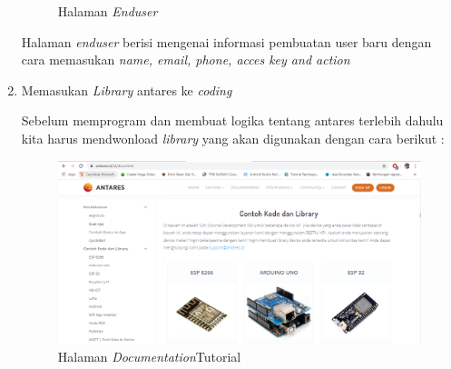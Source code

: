 \begin{enumerate}
\begin{figure}[H]
    \caption{Halaman \textit{Enduser}}
    \label{print}
    \end{figure}
    \par Halaman \textit{enduser} berisi mengenai informasi pembuatan user baru dengan cara memasukan \textit{name, email, phone, acces key and action}
\item Memasukan \textit{ Library} antares ke \textit{coding}
\par Sebelum memprogram dan membuat logika tentang antares terlebih dahulu kita harus mendwonload \textit{library} yang akan digunakan dengan cara berikut :
 \begin{figure}[H]
    \centering
    \includegraphics[width=1\textwidth]{figures/antares12.png}
    \caption{Halaman \textit{Documentation}Tutorial}
    \label{print}
    \end{figure}
     

\end{enumerate}
